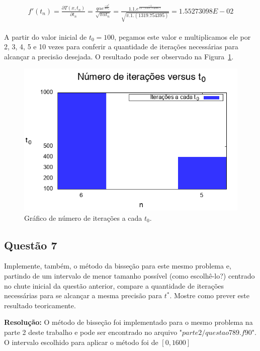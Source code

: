 \documentclass[12pt]{article}
\begin{document}
\begin{eqnarray}
    \begin{split}
        f'(t_{n}) = \frac{\partial T(x, t_{n})}{\partial t_{n}} = \frac{q \alpha e^{\frac{-x^{2}}{4\alpha t_{n}}}}{\sqrt{\pi \alpha t_{n}}} = \frac{1.1.e^{\frac{-1}{4.1.(1319,754395)}}}{\sqrt{\pi.1.(1319.754395)}} = 1.55273098E-02
    \end{split}
    \label{eq:convnewr}
\end{eqnarray}

A partir do valor inicial de $t_{0} = 100$, pegamos este valor e multiplicamos ele por 2, 3, 4, 5 e 10 vezes para conferir a quantidade de iterações necessárias para alcançar a precisão desejada. O resultado pode ser observado na Figura~\ref{fig:p2q6g2}.

\begin{figure}[H]
	\centering
	\includegraphics[width=1\textwidth]{p2q6g2.png}
	\caption{Gráfico de número de iterações a cada $t_{0}$.}
	\label{fig:p2q6g2}
\end{figure}

\subsection*{Questão 7}
\label{sec:p2q7}
Implemente, também, o método da bisseção para este mesmo problema e, partindo de um intervalo de menor tamanho possível (como escolhê-lo?) centrado no chute inicial da questão anterior, compare a quantidade de iterações necessárias para se alcançar a mesma precisão para $t^{*}$. Mostre como prever este resultado teoricamente.

\textbf{Resolução:}
O método de bisseção foi implementado para o mesmo problema na parte 2 deste trabalho e pode ser encontrado no arquivo "$\textit{parte2/questao789.f90}$". O intervalo escolhido para aplicar o método foi de $[0, 1600]$
\end{document}
